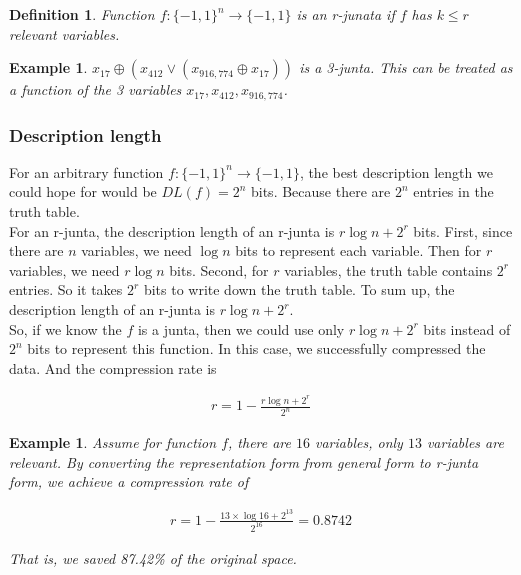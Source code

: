 \documentclass[12pt]{article}
\newtheorem{definition}[theorem]{Definition}
\newtheorem{example}[theorem]{Example}
\begin{document}
\begin{definition}
Function $f: \{ -1, 1 \}^n \rightarrow \{ -1,1 \}$ is an r-junata if $f$ has $k \le r$ relevant variables.
\end{definition}

\begin{example}
$x_{17} \oplus (x_{412} \lor (x_{916,774} \oplus x_{17}))$ is a 3-junta. This can be treated as a function of the 3 variables $x_{17}, x_{412}, x_{916,774}$.
\end{example}

\subsubsection{Description length}

For an arbitrary function $f: \{ -1, 1 \}^n \rightarrow \{ -1,1 \}$, the best description length we could hope for would be $DL(f) = 2^n$ bits. Because there are $2^n$ entries in the truth table. \\

For an r-junta, the description length of an r-junta is $r \log n + 2^r$ bits. First, since there are $n$ variables, we need $\log n$ bits to represent each variable. Then for $r$ variables, we need $r \log n$ bits. Second, for $r$ variables, the truth table contains $2^r$ entries. So it takes $2^r$ bits to write down the truth table.  To sum up, the description length of an r-junta is $r \log n + 2^r$. \\

So, if we know the $f$ is a junta, then we could use only $r \log n + 2^r$ bits instead of $2^n$ bits to represent this function. In this case, we successfully compressed the data. And the compression rate is

\begin{eqnarray*}
r = 1 - \frac{r \log n + 2^r}{2^n}
\end{eqnarray*}

\begin{example}
Assume for function $f$, there are $16$ variables, only $13$ variables are relevant. By converting the representation form from general form to r-junta form, we achieve a compression rate of 

\begin{eqnarray*}
r = 1 - \frac{13 \times \log 16 + 2^{13}}{2^{16}} = 0.8742
\end{eqnarray*}

That is, we saved 87.42\% of the original space.
\end{example}
\end{document}
